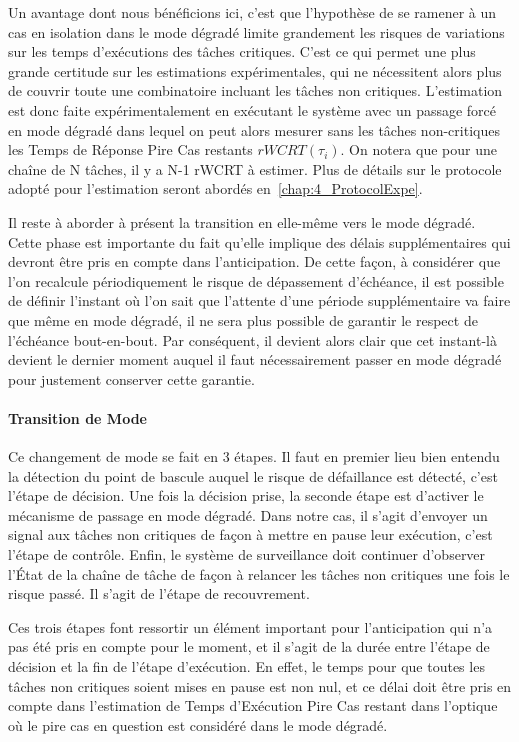 \documentclass[french, a4paper, 11pt, twoside, pdftex]{StyleThese}
\begin{document}
    Un avantage dont nous bénéficions ici, c'est que l'hypothèse de se ramener à un cas en isolation dans le mode dégradé limite grandement les risques de variations sur les temps d'exécutions des tâches critiques. C'est ce qui permet une plus grande certitude sur les estimations expérimentales, qui ne nécessitent alors plus de couvrir toute une combinatoire incluant les tâches non critiques. L'estimation est donc faite expérimentalement en exécutant le système avec un passage forcé en mode dégradé dans lequel on peut alors mesurer sans les tâches non-critiques les Temps de Réponse Pire Cas restants $rWCRT(\tau_i)$. On notera que pour une chaîne de N tâches, il y a N-1 rWCRT à estimer. Plus de détails sur le protocole adopté pour l'estimation seront abordés en~\autoref{chap:4_ProtocolExpe}. 
    
    Il reste à aborder à présent la transition en elle-même vers le mode dégradé. Cette phase est importante du fait qu'elle implique des délais supplémentaires qui devront être pris en compte dans l'anticipation. De cette façon, à considérer que l'on recalcule périodiquement le risque de dépassement d'échéance, il est possible de définir l'instant où l'on sait que l'attente d'une période supplémentaire va faire que même en mode dégradé, il ne sera plus possible de garantir le respect de l'échéance bout-en-bout. Par conséquent, il devient alors clair que cet instant-là devient le dernier moment auquel il faut nécessairement passer en mode dégradé pour justement conserver cette garantie.
        
	\paragraph{Transition de Mode}
    Ce changement de mode se fait en 3 étapes. Il faut en premier lieu bien entendu la détection du point de bascule auquel le risque de défaillance est détecté, c'est l'étape de décision. Une fois la décision prise, la seconde étape est d'activer le mécanisme de passage en mode dégradé. Dans notre cas, il s'agit d'envoyer un signal aux tâches non critiques de façon à mettre en pause leur exécution, c'est l'étape de contrôle. Enfin, le système de surveillance doit continuer d'observer l'État de la chaîne de tâche de façon à relancer les tâches non critiques une fois le risque passé. Il s'agit de l'étape de recouvrement.
    
    Ces trois étapes font ressortir un élément important pour l'anticipation qui n'a pas été pris en compte pour le moment, et il s'agit de la durée entre l'étape de décision et la fin de l'étape d'exécution. En effet, le temps pour que toutes les tâches non critiques soient mises en pause est non nul, et ce délai doit être pris en compte dans l'estimation de Temps d'Exécution Pire Cas restant dans l'optique où le pire cas en question est considéré dans le mode dégradé.
    
\end{document}
